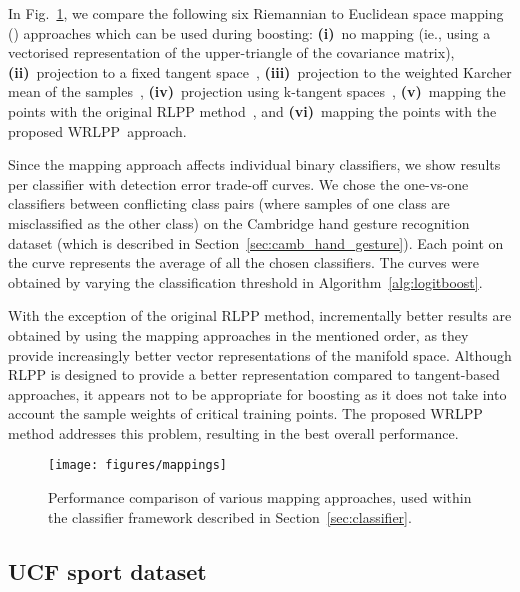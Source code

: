 \documentclass[10pt,twocolumn,letterpaper]{article}
\newcommand{\alg}[1]{\mbox{Algorithm~\ref{#1}}}
\newcommand{\fig}[1]{\mbox{Fig.~\ref{#1}}}
\newcommand{\eqsize}{\footnotesize}
\newcommand{\wrlpp}{WRLPP}
\begin{document}
In \fig{fig:mappings}, we compare the following six Riemannian to Euclidean space mapping ({\eqsize })
approaches which can be used during boosting:
{\bf (i)}~no mapping (ie., using a vectorised representation of the upper-triangle of the covariance matrix),
{\bf (ii)}~projection to a fixed tangent space~\cite{GuoEtAl2010},
{\bf (iii)}~projection to the weighted Karcher mean of the samples~\cite{TuzelEtAl2008},
{\bf (iv)}~projection using k-tangent spaces~\cite{SaninEtAl2012},
{\bf (v)}~mapping the points with the original RLPP method~\cite{HarandiEtAl2012},
and
{\bf (vi)}~mapping the points with the proposed \wrlpp~approach.

Since the mapping approach affects individual binary classifiers,
we show results per classifier with detection error trade-off curves.
We chose the one-vs-one classifiers between conflicting class pairs
(where samples of one class are misclassified as the other class)
on the Cambridge hand gesture recognition dataset
(which is described in Section~\ref{sec:camb_hand_gesture}). Each point on the curve represents the average of all the chosen classifiers.
The curves were obtained by varying the classification threshold {\eqsize } in \alg{alg:logitboost}.

With the exception of the original RLPP method, incrementally better results are obtained by using the mapping approaches in the mentioned order,
as they provide increasingly better vector representations of the manifold space.
Although RLPP is designed to provide a better representation compared to tangent-based approaches,
it appears not to be appropriate for boosting as it does not take into account the sample weights of critical training points.
The proposed WRLPP method addresses this problem, resulting in the best overall performance.

\begin{figure}[!tb]
  \centering
  \texttt{[image: figures/mappings]}
  \caption
    {
    \small
    Performance comparison of various {\eqsize } mapping approaches,
    used within the classifier framework described in Section~\ref{sec:classifier}.
    }
  \label{fig:mappings}
\end{figure}





\subsection{UCF sport dataset}
\vspace{-0.5ex}
\end{document}

